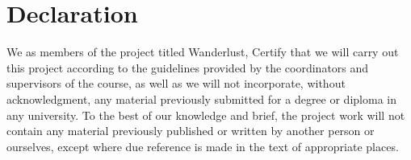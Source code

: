 \section{Declaration}

We as members of the project titled Wanderlust, Certify that we will carry out this project according to the guidelines provided by the coordinators and supervisors of the course, as well as we will not incorporate, without acknowledgment, any material previously submitted for a degree or diploma in any university. To the best of our knowledge and brief, the project work will not contain any material previously published or written by another person or ourselves, except where due reference is made in the text of appropriate places.


\begin{table}[ht]
    \centering



\end{table}
